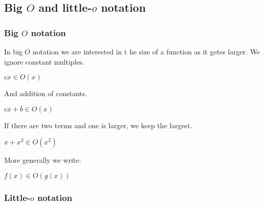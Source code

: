 
\subsection{Big \(O\) and little-\(o\) notation}

\subsubsection{Big \(O\) notation}

In big \(O\) notation we are interested in t he size of a function as it getes larger. We ignore constant multiples.

\(cx\in O(x)\)

And addition of constants.

\(cx+b\in O(x)\)

If there are two terms and one is larger, we keep the largest.

\(x+x^2\in O(x^2)\)

More generally we write:

\(f(x)\in O(g(x))\)

\subsubsection{Little-\(o\) notation}


